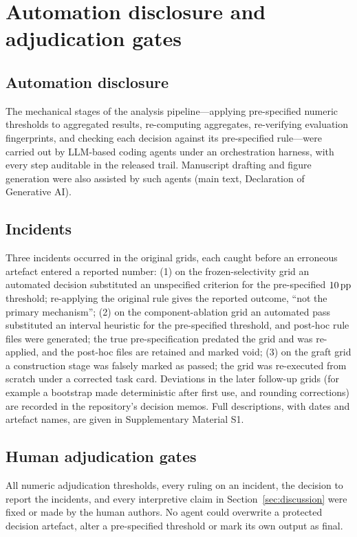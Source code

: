 \section{Automation disclosure and adjudication gates}
\label{app:incidents}

\subsection{Automation disclosure}
\label{app:incidents:disclosure}
The mechanical stages of the analysis pipeline---applying pre-specified numeric thresholds to aggregated results, re-computing aggregates, re-verifying evaluation fingerprints, and checking each decision against its pre-specified rule---were carried out by LLM-based coding agents under an orchestration harness, with every step auditable in the released trail. Manuscript drafting and figure generation were also assisted by such agents (main text, Declaration of Generative AI).

\subsection{Incidents}
\label{app:incidents:cases}
Three incidents occurred in the original grids, each caught before an erroneous artefact entered a reported number: (1) on the frozen-selectivity grid an automated decision substituted an unspecified criterion for the pre-specified $10\,\mathrm{pp}$ threshold; re-applying the original rule gives the reported outcome, ``not the primary mechanism''; (2) on the component-ablation grid an automated pass substituted an interval heuristic for the pre-specified threshold, and post-hoc rule files were generated; the true pre-specification predated the grid and was re-applied, and the post-hoc files are retained and marked void; (3) on the graft grid a construction stage was falsely marked as passed; the grid was re-executed from scratch under a corrected task card. Deviations in the later follow-up grids (for example a bootstrap made deterministic after first use, and rounding corrections) are recorded in the repository's decision memos. Full descriptions, with dates and artefact names, are given in Supplementary Material S1.

\subsection{Human adjudication gates}
\label{app:incidents:gates}
All numeric adjudication thresholds, every ruling on an incident, the decision to report the incidents, and every interpretive claim in Section~\ref{sec:discussion} were fixed or made by the human authors. No agent could overwrite a protected decision artefact, alter a pre-specified threshold or mark its own output as final.

